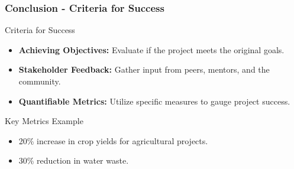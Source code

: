 \documentclass[aspectratio=169]{beamer}
\begin{document}
\begin{frame}[fragile]
    \frametitle{Conclusion - Criteria for Success}
    \begin{block}{Criteria for Success}
        \begin{itemize}
            \item \textbf{Achieving Objectives:} Evaluate if the project meets the original goals.
            \item \textbf{Stakeholder Feedback:} Gather input from peers, mentors, and the community.
            \item \textbf{Quantifiable Metrics:} Utilize specific measures to gauge project success.
        \end{itemize}
    \end{block}
    
    \begin{block}{Key Metrics Example}
        \begin{itemize}
            \item 20\% increase in crop yields for agricultural projects.
            \item 30\% reduction in water waste.
        \end{itemize}
    \end{block}
\end{frame}
\end{document}
